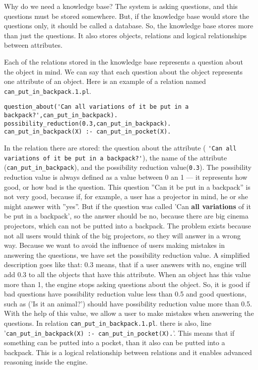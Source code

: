 \documentclass[a4paper]{article}
\begin{document}
Why do we need a knowledge base? The system is asking questions, and this questions must be stored somewhere. But, if the knowledge base would store the questions only, it should be called a database. So, the knowledge base stores more than just the questions. It also stores objects, relations and logical relationships between attributes.

Each of the relations stored in the knowledge base represents a question about the object in mind. We can say that each question about the object represents one attribute of an object. Here is an example of a relation named \verb|can_put_in_backpack.1.pl|.
\begin{lstlisting}[caption=Relation can\_put\_in\_backpack.1.pl,label=lst:relationexample]
question_about('Can all variations of it be put in a backpack?',can_put_in_backpack).
possibility_reduction(0.3,can_put_in_backpack).
can_put_in_backpack(X) :- can_put_in_pocket(X).
\end{lstlisting}
In the relation there are stored: the question about the attribute ( \verb|'Can all variations of it be put in a backpack?'|), the name of the attribute (\verb|can_put_in_backpack|), and the possibility reduction value(\verb|0.3|). The possibility reduction value is always defined as a value between 0 an 1 --- it represents how good, or how bad is the question. This question ''Can it be put in a backpack'' is not very good, because if, for example, a user has a projector in mind, he or she might answer with ''yes''. But if the question was called 'Can \textbf{all variations} of it be put in a backpack', so the answer should be no, because there are big cinema projectors, which can not be putted into a backpack. The problem exists because not all users would think of the big projectors, so they will answer in a wrong way. Because we want to avoid the influence of users making mistakes in answering the questions, we have set the possibility reduction value. A simplified description goes like that: 0.3 means, that if a user answers with no, engine will add 0.3 to all the objects that have this attribute. When an object has this value more than 1, the engine stops asking questions about the object. So, it is good if bad questions have possibility reduction value less than 0.5 and good questions, such as ('Is it an animal?') should have possibility reduction value more than 0.5. With the help of this value, we allow a user to make mistakes when answering the questions.
In relation \verb|can_put_in_backpack.1.pl|. there is also, line '\verb|can_put_in_backpack(X) :- can_put_in_pocket(X).|'. This means that if something can be putted into a pocket, than it also can be putted into a backpack. This is a logical relationship between relations and it enables advanced reasoning inside the engine. 
\end{document}
